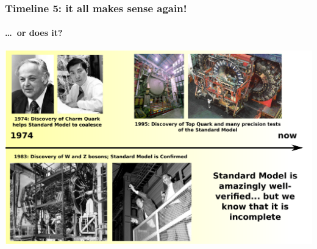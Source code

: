 \documentclass[compress]{beamer}
\begin{document}
\begin{frame}
\frametitle{Timeline 5: it all makes sense again!}
\framesubtitle{\ldots\ or does it?}
\includegraphics[width=\linewidth]{timeline5.pdf}
\end{frame}
\end{document}
